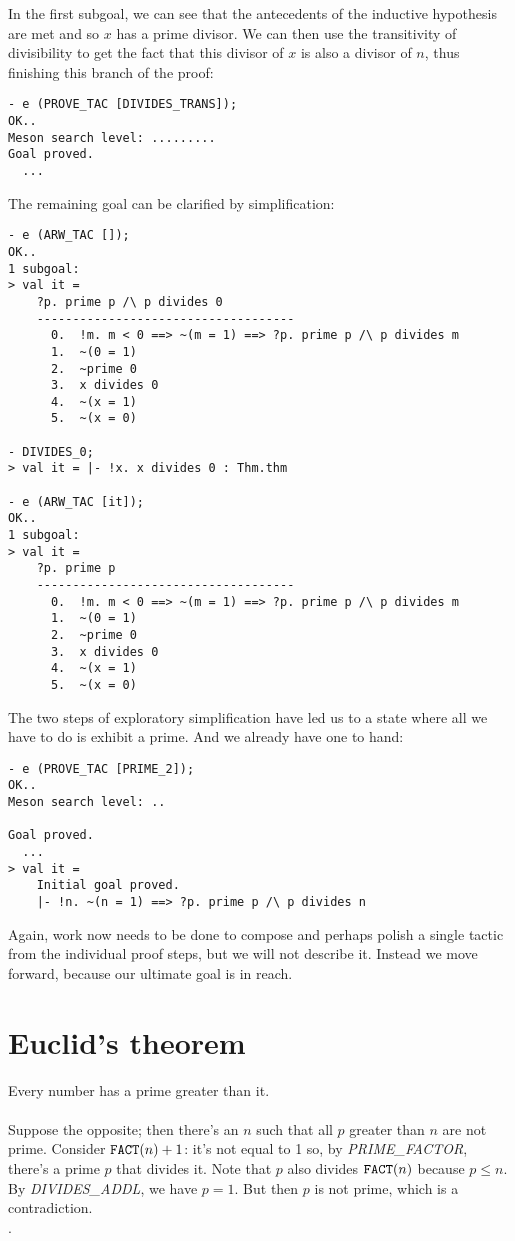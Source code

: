 In the first subgoal, we can see that the antecedents of the inductive
hypothesis are met and so $x$ has a prime divisor. We can then use the
transitivity of divisibility to get the fact that this divisor of $x$ is
also a divisor of $n$, thus finishing this branch of the proof:
\begin{session}\begin{verbatim}
- e (PROVE_TAC [DIVIDES_TRANS]);
OK..
Meson search level: .........
Goal proved.
  ...
\end{verbatim}\end{session}
\noindent The remaining goal can be clarified by simplification:
\begin{session}\begin{verbatim}
- e (ARW_TAC []);
OK..
1 subgoal:
> val it =
    ?p. prime p /\ p divides 0
    ------------------------------------
      0.  !m. m < 0 ==> ~(m = 1) ==> ?p. prime p /\ p divides m
      1.  ~(0 = 1)
      2.  ~prime 0
      3.  x divides 0
      4.  ~(x = 1)
      5.  ~(x = 0)

- DIVIDES_0;
> val it = |- !x. x divides 0 : Thm.thm

- e (ARW_TAC [it]);
OK..
1 subgoal:
> val it =
    ?p. prime p
    ------------------------------------
      0.  !m. m < 0 ==> ~(m = 1) ==> ?p. prime p /\ p divides m
      1.  ~(0 = 1)
      2.  ~prime 0
      3.  x divides 0
      4.  ~(x = 1)
      5.  ~(x = 0)
\end{verbatim}\end{session}
The two steps of exploratory simplification have led us to a state where
all we have to do is exhibit a prime. And we already have one to hand:
\begin{session}\begin{verbatim}
- e (PROVE_TAC [PRIME_2]);
OK..
Meson search level: ..

Goal proved.
  ...
> val it =
    Initial goal proved.
    |- !n. ~(n = 1) ==> ?p. prime p /\ p divides n
\end{verbatim}\end{session}
Again, work now needs to be done to compose and perhaps polish a single
tactic from the individual proof steps, but we will not describe
it. Instead we move forward, because our ultimate goal is in reach.

\section{Euclid's theorem}

 Every number has a prime greater than it.\\
 \\
\noindent Suppose the opposite; then there's an $n$
such that all $p$ greater than $n$ are not prime. Consider $\mbox{\tt
FACT}(n) + 1$: it's not equal to 1 so, by {\small{\it PRIME\_FACTOR}},
there's a prime $p$ that divides it. Note that $p$ also divides
$\mbox{\tt FACT}(n)$ because $p \leq n$. By {\small{\it DIVIDES\_ADDL}},
we have $p=1$. But then $p$ is not prime, which is a contradiction. \\
.


